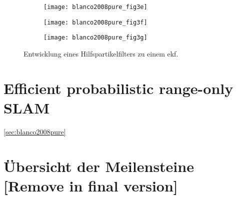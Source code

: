 \begin{figure}
	\begin{subfigure}[t]{0.3\linewidth}
		\texttt{[image: blanco2008pure\_fig3e]}
		\caption{}
		\label{fig:blanco2008pure_fig3e}
	\end{subfigure}
	\hfill
	\begin{subfigure}[t]{0.3\linewidth}
		\texttt{[image: blanco2008pure\_fig3f]}
		\caption{}
		\label{fig:blanco2008pure_fig3f}
	\end{subfigure}
	\hfill
	\begin{subfigure}[t]{0.3\linewidth}
		\texttt{[image: blanco2008pure\_fig3g]}
		\caption{}
		\label{fig:blanco2008pure_fig3g}
	\end{subfigure}
	\caption{Entwicklung eines Hilfspartikelfilters zu einem \Gls{ekf}.}
	\label{fig:blanco2008pure_fig3}
\end{figure}


\begin{comment}
------------------------------------------------------------------------------------------
- \cite{blanco2008efficient}
	- Efficient probabilistic range-only SLAM (71)
\end{comment}
\section{Efficient probabilistic range-only SLAM}

\ref{sec:blanco2008pure}

		


\begin{comment}
------------------------------------------------------------------------------------------
\end{comment}
\section{Übersicht der Meilensteine [Remove in final version]}

